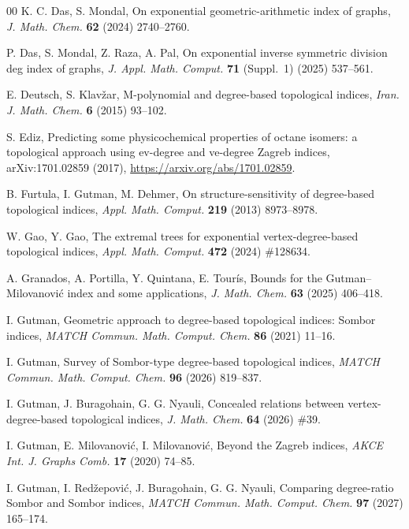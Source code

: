 \documentclass[a5paper, 10pt]{article}
\theoremstyle{plain}
\theoremstyle{remark}
\theoremstyle{definition}
\begin{document}
\begin{thebibliography}{00}
   K. C. Das, S. Mondal, On exponential
  geometric-arithmetic index of graphs, \textit{J. Math. Chem.\/}
  \textbf{62} (2024) 2740--2760.

   P. Das, S. Mondal, Z. Raza,
  A. Pal, On exponential inverse symmetric division deg index of graphs,
  \textit{J. Appl. Math. Comput.\/} \textbf{71} (Suppl.~1) (2025) 537--561.

   E. Deutsch, S. Klav\v{z}ar, M-polynomial and
  degree-based topological indices, \textit{Iran. J. Math. Chem.\/} \textbf{6}
  (2015) 93--102.

  S. Ediz, Predicting some physicochemical properties of octane isomers:
  a topological approach using ev-degree and ve-degree Zagreb indices,
  arXiv:1701.02859 (2017), \url{https://arxiv.org/abs/1701.02859}.

   B. Furtula, I. Gutman, M. Dehmer, On
  structure-sensitivity of degree-based topological indices, \textit{Appl.
  Math. Comput.\/} \textbf{219} (2013) 8973--8978.

   W. Gao, Y. Gao, The extremal trees for
  exponential vertex-degree-based topological indices, \textit{Appl.
  Math. Comput.\/} \textbf{472} (2024) \#128634.

   A. Granados, A. Portilla, Y. Quintana,
  E. Tour\'is, Bounds for the Gutman--Milovanovi\'c index and some
  applications, \textit{J. Math. Chem.\/} \textbf{63} (2025)
  406--418.

   I. Gutman, Geometric approach to degree-based
  topological indices: Sombor indices, \textit{MATCH Commun. Math. Comput.
  Chem.\/} \textbf{86} (2021) 11--16.

   I. Gutman, Survey of Sombor-type
  degree-based topological indices, \textit{MATCH Commun. Math. Comput.
  Chem.\/} \textbf{96} (2026) 819--837.

   I. Gutman, J. Buragohain,
  G. G. Nyauli, Concealed relations between vertex-degree-based
  topological indices, \textit{J. Math. Chem.\/} \textbf{64} (2026) \#39.

   I. Gutman, E. Milovanovi\'c,
  I. Milovanovi\'c, Beyond the Zagreb indices, \textit{AKCE Int. J.
  Graphs Comb.\/} \textbf{17} (2020) 74--85.

   I. Gutman, I. Red\v{z}epovi\'c,
  J. Buragohain, G. G. Nyauli, Comparing degree-ratio Sombor and Sombor indices,
  \textit{MATCH Commun. Math. Comput. Chem.\/} \textbf{97} (2027) 165--174.


\end{thebibliography}
\end{document}
